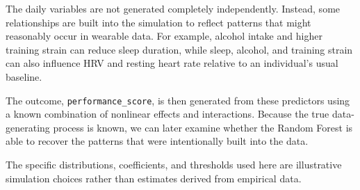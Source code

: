 \documentclass[
  letterpaper,
  DIV=11,
  numbers=noendperiod]{scrreprt}
\begin{document}
The daily variables are not generated completely independently. Instead,
some relationships are built into the simulation to reflect patterns
that might reasonably occur in wearable data. For example, alcohol
intake and higher training strain can reduce sleep duration, while
sleep, alcohol, and training strain can also influence HRV and resting
heart rate relative to an individual's usual baseline.

The outcome, \texttt{performance\_score}, is then generated from these
predictors using a known combination of nonlinear effects and
interactions. Because the true data-generating process is known, we can
later examine whether the Random Forest is able to recover the patterns
that were intentionally built into the data.

The specific distributions, coefficients, and thresholds used here are
illustrative simulation choices rather than estimates derived from
empirical data.
\end{document}
